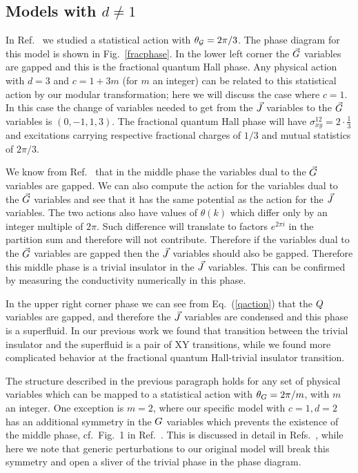 \subsection{Models with $d\neq 1$}
In Ref.~\cite{short_range3} we studied a statistical action with $\theta_{\cal{G}} = 2\pi/3$. The phase diagram for this model is shown in Fig.~\ref{fracphase}. In the lower left corner the $\vec{G}$ variables are gapped and this is the fractional quantum Hall phase. Any physical action with $d=3$ and $c=1+3m$ (for $m$ an integer) can be related to this statistical action by our modular transformation; here we will discuss the case where $c=1$. In this case the change of variables needed to get from the $\vec{J}$ variables to the $\vec{G}$ variables is $(0, -1, 1, 3)$. The fractional quantum Hall phase will have $\sigma^{12}_{xy}=2\cdot\frac{1}{3}$ and excitations carrying respective fractional charges of $1/3$ and mutual statistics of $2\pi/3$.

We know from Ref.~\cite{short_range3} that in the middle phase the variables dual to the $\vec{G}$ variables are gapped. 
We can also compute the action for the variables dual to the $\vec{G}$ variables and see that it has the same potential as the action for the $\vec{J}$ variables. The two actions also have values of $\theta(k)$ which differ only by an integer multiple of $2\pi$. Such difference will translate to factors $e^{2\pi i}$ in the partition sum and therefore will not contribute. Therefore if the variables dual to the $\vec{G}$ variables are gapped then the $\vec{J}$ variables should also be gapped. Therefore this middle phase is a trivial insulator in the $\vec{J}$ variables. This can be confirmed by measuring the conductivity numerically in this phase. 

In the upper right corner phase we can see from Eq.~(\ref{qaction}) that the $Q$ variables are gapped,  and therefore the $\vec{J}$ variables are condensed and this phase is a superfluid.  In our previous work\cite{short_range3} we found that transition between the trivial insulator and the superfluid is a pair of XY transitions, while we found more complicated behavior at the fractional quantum Hall-trivial insulator transition. 

The structure described in the previous paragraph holds for any set of physical variables which can be mapped to a statistical action with $\theta_G=2\pi/m$, with $m$ an integer. %
One exception is $m=2$, where our specific model with $c=1, d=2$ has an additional symmetry in the $G$ variables which prevents the existence of the middle phase, cf.~Fig.~1 in Ref.~\cite{Loopy}.  This is discussed in detail in Refs.~\cite{Loopy, Gen2Loops}, while here we note that generic perturbations to our original model will break this symmetry and open a sliver of the trivial phase in the phase diagram.

